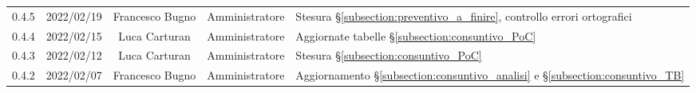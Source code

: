 \begin{center}
\begin{longtable}[c]{c | c | c | c | p{5cm}}
		0.4.5                                                      & 2022/02/19 & Francesco Bugno                        & Amministratore & Stesura §\ref{subsection:preventivo_a_finire}, controllo errori ortografici                                                               \\
		0.4.4                                                      & 2022/02/15 & Luca Carturan                          & Amministratore & Aggiornate tabelle §\ref{subsection:consuntivo_PoC}                                                                                       \\
		0.4.3                                                      & 2022/02/12 & Luca Carturan                          & Amministratore & Stesura §\ref{subsection:consuntivo_PoC}                                                                                                  \\
		0.4.2                                                      & 2022/02/07 & Francesco Bugno                        & Amministratore & Aggiornamento §\ref{subsection:consuntivo_analisi} e §\ref{subsection:consuntivo_TB}                                                      \\


\end{longtable}
\end{center}
